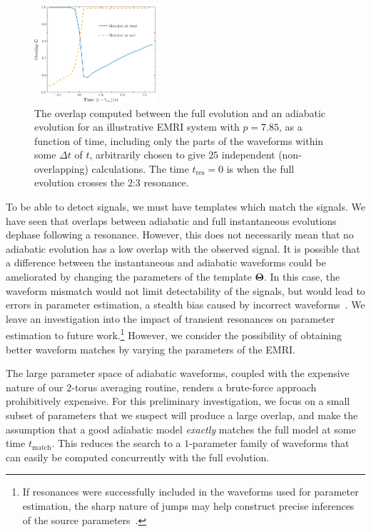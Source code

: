 \documentclass[aps,prd,amsfonts,amssymb,amsmath,nofootinbib,showpacs,superscriptaddress,twocolumn,floatfix]{revtex4-1}
\newcommand{\sub}[1]{\ensuremath{_\mathrm{#1}}}
\begin{document}
\begin{figure}
\centering
\includegraphics[width=0.4\textwidth]{Fig_overlap}
\caption{\label{fig:overlap-dephasing}The overlap computed between the full evolution and an adiabatic evolution for an illustrative EMRI system with $p=7.85$, as a function of time, including only the parts of the waveforms within some $\Delta t$ of $t$, arbitrarily chosen to give $25$ independent (non-overlapping) calculations. The time $t\sub{res} = 0$ is when the full evolution crosses the $2$:$3$ resonance.}
\end{figure}

To be able to detect signals, we must have templates which match the signals. We have seen that overlaps between adiabatic and full instantaneous evolutions dephase following a resonance. However, this does not necessarily mean that no adiabatic evolution has a low overlap with the observed signal. It is possible that a difference between the instantaneous and adiabatic waveforms could be ameliorated by changing the parameters of the template $\boldsymbol{\Theta}$. In this case, the waveform mismatch would not limit detectability of the signals, but would lead to errors in parameter estimation, a stealth bias caused by incorrect waveforms~\cite{Cutler2007}. We leave an investigation into the impact of transient resonances on parameter estimation to future work.\footnote{If resonances were successfully included in the waveforms used for parameter estimation, the sharp nature of jumps may help construct precise inferences of the source parameters~\cite{Mandel2014}.} However, we consider the possibility of obtaining better waveform matches by varying the parameters of the EMRI.

The large parameter space of adiabatic waveforms, coupled with the expensive nature of our $2$-torus averaging routine, renders a brute-force approach prohibitively expensive. For this preliminary investigation, we focus on a small subset of parameters that we suspect will produce a large overlap, and make the assumption that a good adiabatic model \emph{exactly} matches the full model at some time $t\sub{match}$. This reduces the search to a $1$-parameter family of waveforms that can easily be computed concurrently with the full evolution.
\end{document}
